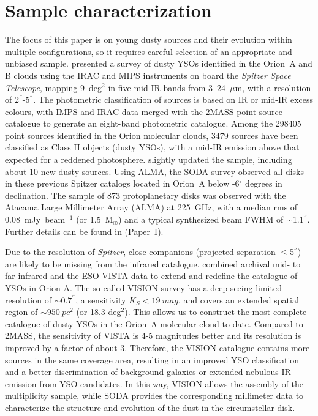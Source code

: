 \documentclass{aa}
\begin{document}
\section{Sample characterization} \label{section2}
The focus of this paper is on young dusty sources and their evolution within multiple configurations, so it requires careful selection of an appropriate and unbiased sample. \cite{Megeath12} presented a survey of dusty YSOs identified in the Orion~A and B clouds using the IRAC and MIPS instruments on board the \textit{Spitzer Space Telescope}, mapping 9~deg$^2$ in five mid-IR bands from 3–24~$\mu$m, with a resolution of 2$^{''}$-5$^{''}$. The photometric classification of sources is based on IR or mid-IR excess colours, with IMPS and IRAC data merged with the 2MASS point source catalogue to generate an eight-band photometric catalogue. Among the 298405 point sources identified in the Orion molecular clouds, 3479 sources have been classified as Class II objects (dusty YSOs), with a mid-IR emission above that expected for a reddened photosphere. \cite{Megeath16} slightly updated the sample, including about 10 new dusty sources. Using ALMA, the SODA survey \citep{vanTerwisga22} observed all disks in these previous Spitzer catalogs located in Orion~A below -6$^{\circ}$ degrees in declination. The sample of 873 protoplanetary disks was observed with the Atacama Large Millimeter Array (ALMA) at 225~GHz, with a median rms of 0.08~mJy~beam$^{-1}$ (or 1.5~M$_{\oplus}$) and a typical synthesized beam FWHM of $\sim$1.1$^{''}$. Further details can be found in \cite{vanTerwisga22} (Paper~I). \par
Due to the resolution of \textit{Spitzer}, close companions (projected separation $\leq$5$^{''}$) are likely to be missing from the infrared catalogue. \cite{Grosschedl19} combined archival mid- to far-infrared \citep{Megeath12, Megeath16, Furlan16, Lewis16} and the ESO-VISTA \citep{Meingast16} data to extend and redefine the catalogue of YSOs in Orion A. The so-called VISION survey has a deep seeing-limited resolution of $\sim 0.7^{''}$, a sensitivity $K_S < 19~mag$, and covers an extended spatial region of $\sim 950~pc^2$ (or 18.3 deg$^2$). This allows us to construct the most complete catalogue of dusty YSOs in the Orion~A molecular cloud to date. Compared to 2MASS, the sensitivity of VISTA is 4-5 magnitudes better and its resolution is improved by a factor of about 3. Therefore, the VISION catalogue contains more sources in the same coverage area, resulting in an improved YSO classification and a better discrimination of background galaxies or extended nebulous IR emission from YSO candidates. In this way, VISION allows the assembly of the multiplicity sample, while SODA provides the corresponding millimeter data to characterize the structure and evolution of the dust in the circumstellar disk.
\end{document}

